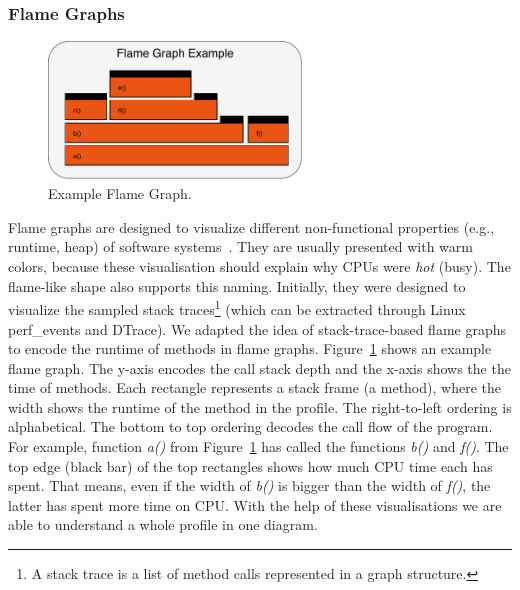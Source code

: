 
\subsubsection{Flame Graphs}

\begin{figure}[h]
  \centering
  \includegraphics[width=0.6\textwidth]{images/Exampleflamegraph}
  \caption{Example Flame Graph.}
  \label{ex_flame_graph}
\end{figure}

Flame graphs are designed to visualize different non-functional properties (e.g., runtime, heap) of software systems~\cite{Gregg:2016:FG:2927299.2927301}. They are usually presented with warm colors, because these visualisation should explain why CPUs were \textit{hot} (busy). The flame-like shape also supports this naming. Initially, they were designed to visualize the sampled stack traces\footnote{A stack trace is a list of method calls represented in a graph structure.} (which can be extracted through Linux perf\_events and DTrace). We adapted the idea of stack-trace-based flame graphs to encode the runtime of methods in flame graphs. Figure~\ref{ex_flame_graph} shows an example flame graph. The y-axis encodes the call stack depth and the x-axis shows the the time of methods. Each rectangle represents a stack frame (a method), where the width shows the runtime of the method in the profile. The right-to-left ordering is alphabetical. The bottom to top ordering decodes the call flow of the program. For example, function \textit{a()} from Figure~\ref{ex_flame_graph} has called the functions \textit{b()} and \textit{f()}. The top edge (black bar) of the top rectangles shows how much CPU time each has spent. That means, even if the width of \textit{b()} is bigger than the width of \textit{f()}, the latter has spent more time on CPU. With the help of these visualisations we are able to understand a whole profile in one diagram.

